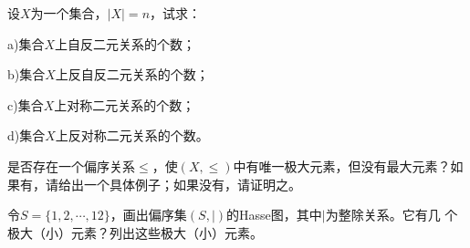 \documentclass{article}
\begin{document}
\begin{CJK}{UTF8}{gbsn}
\begin{Exercise}
  设$X$为一个集合，$|X|=n$，试求：

  a)集合$X$上自反二元关系的个数；

  b)集合$X$上反自反二元关系的个数；

  c)集合$X$上对称二元关系的个数；

  d)集合$X$上反对称二元关系的个数。
\end{Exercise}
\vspace{10cm}
\begin{Exercise}
  是否存在一个偏序关系$\leq$，使$(X,\leq)$中有唯一极大元素，但没有最大元素？如果有，请给出一个具体例子；如果没有，请证明之。
\end{Exercise}
\vspace{5cm}
\begin{Exercise}
  令$S=\{1,2,\cdots,12\}$，画出偏序集$(S,|)$的Hasse图，其中$|$为整除关系。它有几
  个极大（小）元素？列出这些极大（小）元素。
\end{Exercise}
\end{CJK}
\end{document}
